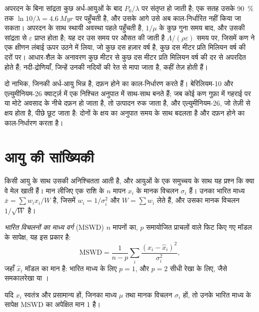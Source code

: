 अपरदन के बिना सांद्रता कुछ अर्ध-आयुओं के बाद $P_0/\lambda$ पर संतृप्त हो जाती है;
एक सतह उसके \qty{90}{\percent} तक $\ln 10/\lambda
= \qty{4.6}{Myr}$ पर पहुँचती है, और उसके आगे उसे अब काल-निर्धारित नहीं किया जा सकता। अपरदन के साथ
स्थायी अवस्था पहले पहुँचती है, $1/\mu$ के कुछ गुना समय बाद, और उसकी
सांद्रता से $\varepsilon$ प्राप्त होता है; यह दर उस समय पर औसत की जाती है
$\Lambda/(\rho\varepsilon)$ समय पर, जिसमें कण ने एक
क्षीणन लंबाई ऊपर उठने में लिया, जो कुछ दस हज़ार वर्ष है, कुछ दस मीटर प्रति
मिलियन वर्ष की दरों पर। आधार-शैल के अनावरण कुछ मीटर
से कुछ दस मीटर प्रति मिलियन वर्ष की दर से अपरदित होते हैं; नदी-द्रोणियाँ,
जिन्हें उनकी नदियों की रेत से मापा जाता है, कहीं तेज़ होती हैं।

दो नाभिक, जिनकी अर्ध-आयु भिन्न है, दफ़न होने का काल-निर्धारण करते हैं। बेरिलियम-10 और
एल्युमीनियम-26 क्वार्ट्ज़ में एक निश्चित अनुपात में साथ-साथ बनते हैं; जब कोई कण
गुफ़ा में गहराई पर या मोटे अवसाद के नीचे दफ़न हो जाता है, तो उत्पादन रुक जाता है, और
एल्युमीनियम-26, जो तेज़ी से क्षय होता है, पीछे छूट जाता है: दोनों के क्षय का अनुपात
समय के साथ बदलता है और दफ़न होने का काल-निर्धारण करता है।

\section{आयु की सांख्यिकी}\label{sec:b3:advanced-geochronology:statistics}

किसी आयु के साथ उसकी अनिश्चितता आती है, और आयुओं के एक समुच्चय के साथ यह प्रश्न
कि क्या वे मेल खाती हैं। मान लीजिए एक राशि के $n$ मापन $x_i$ के
मानक विचलन $\sigma_i$ हैं। उनका भारित माध्य $\bar x = \sum w_ix_i/W$ है, जिसमें
$w_i = 1/\sigma_i^2$ और $W = \sum w_i$ लेते हैं, और उसका मानक विचलन
$1/\sqrt W$ है।

\begin{definition}[भारित विचलनों का माध्य वर्ग]\label{def:b3:advanced-geochronology:mswd}
\emph{भारित विचलनों का माध्य वर्ग}
(MSWD) $n$ मापनों का, $p$ समायोजित प्राचलों वाले फिट किए गए मॉडल के सापेक्ष,
यह इस प्रकार है:
\[
\mathrm{MSWD} = \frac{1}{n - p}\sum_i \frac{(x_i - \hat x_i)^2}{\sigma_i^2},
\]
जहाँ $\hat x_i$ मॉडल का मान है: भारित माध्य के लिए $p = 1$, और
$p = 2$ सीधी रेखा के लिए, जैसे समकालरेखा या ।
\end{definition}

\begin{proposition}[MSWD का अपेक्षित मान एक है]\label{prop:b3:advanced-geochronology:mswd}
यदि $x_i$ स्वतंत्र और प्रसामान्य हों, जिनका माध्य $\mu$ तथा मानक
विचलन $\sigma_i$ हों, तो उनके भारित माध्य के सापेक्ष MSWD का अपेक्षित मान 1 है।
\end{proposition}

